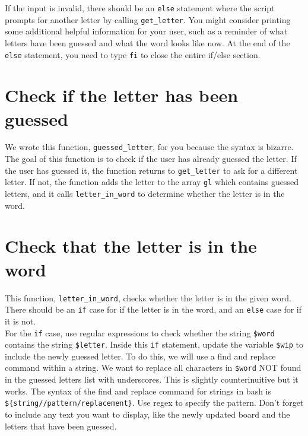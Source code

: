 \documentclass{article}
\begin{document}
If the input is invalid, there should be an \verb|else| statement where the script prompts for another letter by calling \verb|get_letter|. You might consider printing some additional helpful information for your user, such as a reminder of what letters have been guessed and what the word looks like now. At the end of the \verb|else| statement, you need to type \verb|fi| to close the entire if/else section.



\section*{Check if the letter has been guessed}

\indent\indent We wrote this function, \verb|guessed_letter|, for you because the syntax is bizarre. The goal of this function is to check if the user has already guessed the letter. If the user has guessed it, the function returns to \verb|get_letter| to ask for a different letter. If not, the function adds the letter to the array \verb|gl| which contains  guessed letters, and it calls \verb|letter_in_word| to determine whether the letter is in the word.



\section*{Check that the letter is in the word}

\indent\indent This function, \verb|letter_in_word|, checks whether the letter is in the given word. There should be an \verb|if| case for if the letter is in the word, and an \verb|else| case for if it is not. \\

For the \verb|if| case, use regular expressions to check whether the string \verb|$word| contains the string \verb|$letter|. Inside this \verb|if| statement, update the variable \verb|$wip| to include the newly guessed letter. To do this, we will use a find and replace command within a string. We want to replace all characters in \verb|$word| NOT found in the guessed letters list with underscores. This is slightly counterinuitive but it works. The syntax of the find and replace command for strings in bash is \verb|${string//pattern/replacement}|. Use regex to specify the pattern. Don't forget to include any text you want to display, like the newly updated board and the letters that have been guessed. \\
\end{document}
